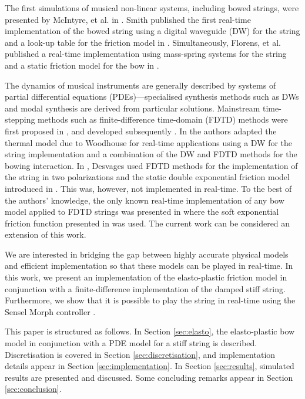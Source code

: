 \documentclass[twoside,a4paper,dvipsnames]{article}
\begin{document}
The first simulations of musical non-linear systems, including bowed strings, were presented by McIntyre, et al. in \cite{McIntyre1983}. Smith published the first real-time implementation of the bowed string using a digital waveguide (DW) for the string and a look-up table for the friction model in \cite{Smith1986}. Simultaneously, Florens, et al. published a real-time implementation using mass-spring systems for the string and a static friction model for the bow in \cite{Florens1986}. 

The dynamics of musical instruments are generally described by systems of  partial differential equations (PDEs)---specialised synthesis methods such as DWs \cite{Smith1992} and modal synthesis \cite{Morrison1993} are derived from particular solutions.  Mainstream time-stepping methods such as finite-difference time-domain (FDTD) methods were first proposed in \cite{Hiller, Hiller2, Chaigne}, and developed subsequently \cite{Bilbao2009, Bilbao2018}. In \cite{Maestre2014} the authors adapted the thermal model due to Woodhouse \cite{Woodhouse2003} for real-time applications using a DW for the string implementation and a combination of the DW and FDTD methods for the bowing interaction. In \cite{Desvages2017, Desvages2015}, Desvages used FDTD methods for the implementation of the string in two polarizations and the static double exponential friction model introduced in \cite{Smith2000}. This was, however, not implemented in real-time. To the best of the authors' knowledge, the only known real-time implementation of any bow model applied to FDTD strings was presented in \cite{Willemsen2019} where the soft exponential friction function presented in \cite{Bilbao2009} was used. The current work can be considered an extension of this work.

We are interested in bridging the gap between highly accurate physical models and efficient implementation so that these models can be played in real-time. In this work, we present an implementation of the elasto-plastic friction model in conjunction with a finite-difference implementation of the damped stiff string. Furthermore, we show that it is possible to play the string in real-time using the Sensel Morph controller \cite{Sensel2019}.

This paper is structured as follows. In Section \ref{sec:elasto}, the elasto-plastic bow model in conjunction with a PDE model for a stiff string is described. Discretisation is covered in Section \ref{sec:discretisation}, and implementation details appear in Section \ref{sec:implementation}. In Section \ref{sec:results}, simulated results are presented and discussed. Some concluding remarks appear in Section  \ref{sec:conclusion}.
\end{document}
